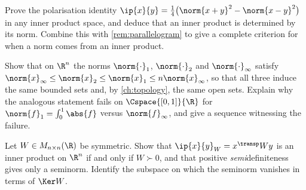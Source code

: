 \begin{exercise}\label{ex:met-1}
	Prove the polarisation identity
	$\ip{x}{y}=\tfrac14\bigl(\norm{x+y}^2-\norm{x-y}^2\bigr)$ in any inner product
	space, and deduce that an inner product is determined by its norm. Combine this
	with \autoref{rem:parallelogram} to give a complete criterion for when a norm
	comes from an inner product.
\end{exercise}

\begin{exercise}\label{ex:met-2}
	Show that on $\R^n$ the norms $\norm{\cdot}_1$, $\norm{\cdot}_2$ and
	$\norm{\cdot}_\infty$ satisfy
	$\norm{x}_\infty\leq\norm{x}_2\leq\norm{x}_1\leq n\norm{x}_\infty$, so that all
	three induce the same bounded sets and, by \autoref{ch:topology}, the same open
	sets. Explain why the analogous statement fails on $\Cspace{[0,1]}{\R}$ for
	$\norm{f}_1=\int_0^1\abs{f}$ versus $\norm{f}_\infty$, and give a sequence
	witnessing the failure.
\end{exercise}

\begin{exercise}\label{ex:met-3}
	Let $W\in M_{n\times n}(\R)$ be symmetric. Show that
	$\ip{x}{y}_W=x^{\transp}Wy$ is an inner product on $\R^n$ if and only if
	$W\succ0$, and that positive \emph{semi}definiteness gives only a seminorm.
	Identify the subspace on which the seminorm vanishes in terms of $\Ker W$.
\end{exercise}
